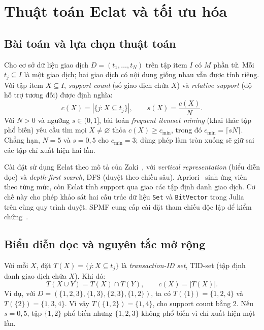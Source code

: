 \section{Thuật toán Eclat và tối ưu hóa}
\label{sec:tv1}

\subsection{Bài toán và lựa chọn thuật toán}
Cho cơ sở dữ liệu giao dịch $D=(t_1,\ldots,t_N)$ trên tập item $I$ có $M$ phần tử. Mỗi $t_j\subseteq I$ là một giao dịch; hai giao dịch có nội dung giống nhau vẫn được tính riêng. Với tập item $X\subseteq I$, \emph{support count} (số giao dịch chứa $X$) và \emph{relative support} (độ hỗ trợ tương đối) được định nghĩa:
\begin{equation}
 c(X)=|\{j:X\subseteq t_j\}|,\qquad s(X)=\frac{c(X)}{N}.
 \label{eq:tv1-support}
\end{equation}
Với $N>0$ và ngưỡng $s\in(0,1]$, bài toán \emph{frequent itemset mining} (khai thác tập phổ biến) yêu cầu tìm mọi $X\ne\varnothing$ thỏa $c(X)\ge c_{\min}$, trong đó $c_{\min}=\lceil s N\rceil$. Chẳng hạn, $N=5$ và $s=0{,}5$ cho $c_{\min}=3$; dùng phép làm tròn xuống sẽ giữ sai các tập chỉ xuất hiện hai lần.

Cài đặt sử dụng Eclat theo mô tả của Zaki~\cite{zaki}, với \emph{vertical representation} (biểu diễn dọc) và \emph{depth-first search}, DFS (duyệt theo chiều sâu). Apriori~\cite{agrawal} sinh ứng viên theo từng mức, còn Eclat tính support qua giao các tập định danh giao dịch. Cơ chế này cho phép khảo sát hai cấu trúc dữ liệu \texttt{Set} và \texttt{BitVector} trong Julia~\cite{julia} trên cùng quy trình duyệt. SPMF cung cấp cài đặt tham chiếu độc lập để kiểm chứng~\cite{spmf}.

\subsection{Biểu diễn dọc và nguyên tắc mở rộng}
Với mỗi $X$, đặt $T(X)=\{j:X\subseteq t_j\}$ là \emph{transaction-ID set}, TID-set (tập định danh giao dịch chứa $X$). Khi đó:
\begin{equation}
 T(X\cup Y)=T(X)\cap T(Y),\qquad c(X)=|T(X)|.
 \label{eq:tv1-intersection}
\end{equation}
Ví dụ, với $D=(\{1,2,3\},\{1,3\},\{2,3\},\{1,2\})$, ta có $T(\{1\})=\{1,2,4\}$ và $T(\{2\})=\{1,3,4\}$. Vì vậy $T(\{1,2\})=\{1,4\}$, cho support count bằng 2. Nếu $s=0{,}5$, tập $\{1,2\}$ phổ biến nhưng $\{1,2,3\}$ không phổ biến vì chỉ xuất hiện một lần.

